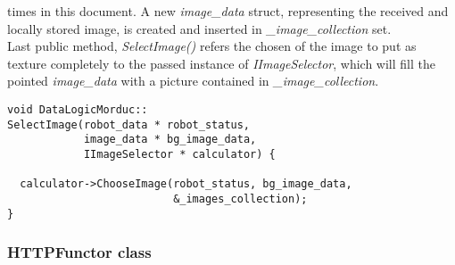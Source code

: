 times in this document. A new \textit{image\_data} struct, representing
the received and locally stored image, is created and inserted in
\textit{\_image\_collection} set.
\\
Last public method, \textit{SelectImage()} refers the chosen of the image
to put as texture completely to the passed instance of
\textit{IImageSelector}, which will fill the pointed \textit{image\_data}
with a picture contained in \textit{\_image\_collection}.
\\
\begin{lstlisting}[caption={\texttt{DataLogicMorduc::SelectImage()} method},
    label={code:datalogicmorduc:selectimage}]
void DataLogicMorduc::
SelectImage(robot_data * robot_status,
            image_data * bg_image_data,
            IImageSelector * calculator) {

  calculator->ChooseImage(robot_status, bg_image_data,
                          &_images_collection);
}

\end{lstlisting}

\subsubsection{HTTPFunctor class}
\label{concr:idatalogic:datalogicmorduc:httpfunctor}

